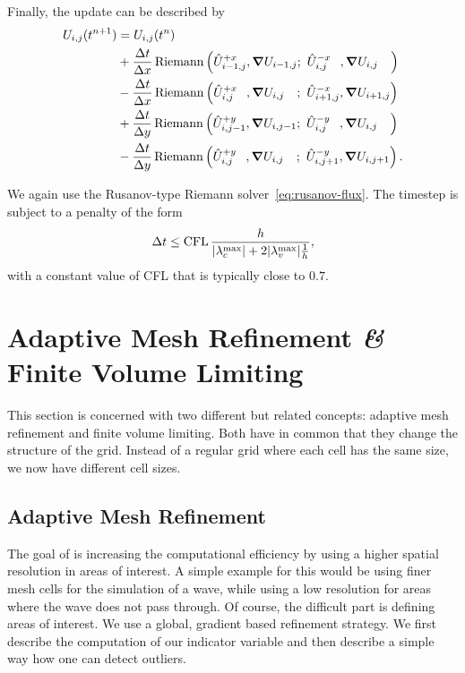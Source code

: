 Finally, the update can be described by
\begin{align}
  \begin{split}
    \cellAvg (t^{n+1}) &= \cellAvg (t^n)
    \\ &+
  \frac{\Delta t}{\Delta x}
    \Riemann \left(
      \evolvedCellAvg[i-1,j]{+x}, \gradCellAvg[i-1,j]; \ %
      \evolvedCellAvg[i,j\phantom{-1}]{-x}, \gradCellAvg[i,j\phantom{-1}]
    \right)
    \\ &-
  \frac{\Delta t}{\Delta x}
    \Riemann \left(
      \evolvedCellAvg[i,j\phantom{+1}]{+x}, \gradCellAvg[i,j\phantom{+1}]; \ %
      \evolvedCellAvg[i+1,j]{-x}, \gradCellAvg[i+1,j]
    \right)
    \\ &+
  \frac{\Delta t}{\Delta y}
    \Riemann \left(
      \evolvedCellAvg[i,j-1]{+y}, \gradCellAvg[i,j-1]; \ %
      \evolvedCellAvg[i,j\phantom{-1}]{-y}, \gradCellAvg[i,j\phantom{-1}]
    \right)
    \\ &-
  \frac{\Delta t}{\Delta y}
    \Riemann \left(
      \evolvedCellAvg[i,j\phantom{+1}]{+y}, \gradCellAvg[i,j\phantom{+1}]; \ %
      \evolvedCellAvg[i,j+1]{-y}, \gradCellAvg[i,j+1]
    \right).
  \end{split}
\end{align}

We again use the Rusanov-type Riemann solver~\cref{eq:rusanov-flux}.
The timestep is subject to a penalty of the form
\begin{equation}\label{eq:cfl-muscl}
 \Delta t \leq  \text{CFL} \, \frac{h}{\maxConvEigen + 2 \maxViscEigen \frac{1}{h}},
\end{equation}
with a constant value of CFL that is typically close to $0.7$.

\section{Adaptive Mesh Refinement \textit{\&} Finite Volume Limiting}\label{sec:grid}
This section is concerned with two different but related concepts:%
adaptive mesh refinement \amr{} and finite volume limiting.
Both have in common that they change the structure of the grid.
Instead of a regular grid where each cell has the same size, we now have different cell sizes.

\subsection{Adaptive Mesh Refinement}\label{sec:amr}
The goal of \amr{} is increasing the computational efficiency by using a higher spatial resolution in areas of interest.
A simple example for this would be using finer mesh cells for the simulation of a wave, while using a low resolution for areas where the wave does not pass through.
Of course, the difficult part is defining areas of interest.
We use a global, gradient based refinement strategy.
We first describe the computation of our indicator variable and then describe a simple way how one can detect outliers.

